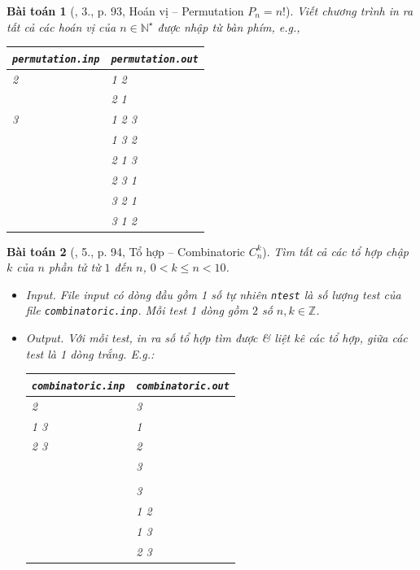 \documentclass{article}
\newtheorem{baitoan}{Bài toán}
\begin{document}
\begin{baitoan}[\cite{VietSTEM2021}, 3., p. 93, Hoán vị -- Permutation $P_n = n!$]
	Viết chương trình in ra tất cả các hoán vị của $n\in\mathbb{N}^\star$ được nhập từ bàn phím, e.g.,
	\begin{table}[H]
		\centering
		\begin{tabular}{|l|l|}
			\hline
			\texttt{permutation.inp} & \texttt{permutation.out} \\
			\hline
			2 & 1 2 \\
			& 2 1 \\
			\hline
			3 & 1 2 3 \\
			& 1 3 2 \\
			& 2 1 3 \\
			& 2 3 1 \\
			& 3 2 1 \\
			& 3 1 2 \\
			\hline
		\end{tabular}
	\end{table}
\end{baitoan}

\begin{baitoan}[\cite{VietSTEM2021}, 5., p. 94, Tổ hợp -- Combinatoric $C_n^k$]
	Tìm tất cả các tổ hợp chập $k$ của $n$ phần tử từ $1$ đến $n$, $0 < k\le n < 10$.
	\begin{itemize}
		\item {\sf Input.} File input có dòng đầu gồm 1 số tự nhiên \texttt{ntest} là số lượng test của file \verb|combinatoric.inp|. Mỗi test 1 dòng gồm $2$ số $n,k\in\mathbb{Z}$. 
		\item {\sf Output.} Với mỗi test, in ra số tổ hợp tìm được \& liệt kê các tổ hợp, giữa các test là 1 dòng trắng. E.g.:
		\begin{table}[H]
			\centering
			\begin{tabular}{|l|l|}
				\hline
				\texttt{combinatoric.inp} & \texttt{combinatoric.out} \\
				\hline
				2 & 3 \\
				1 3 & 1 \\
				2 3 & 2 \\
				& 3 \\
				& \\
				& 3 \\
				& 1 2 \\
				& 1 3 \\
				& 2 3 \\
				\hline
			\end{tabular}
		\end{table}
	\end{itemize}
\end{baitoan}
\end{document}
